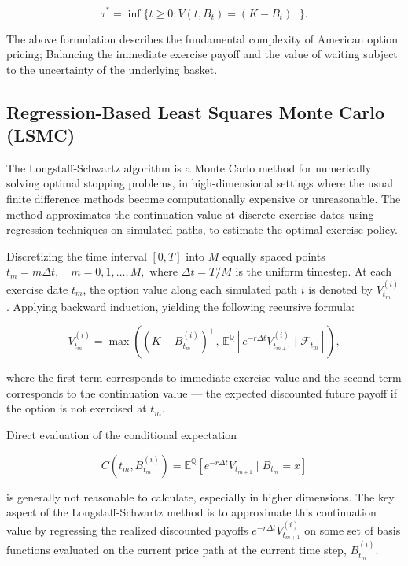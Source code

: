 \documentclass[titlepage]{article}
\begin{document}
\[
\tau^* = \inf \{ t \geq 0 : V(t, B_t) = (K - B_t)^+ \}.
\]

The above formulation describes the fundamental complexity of American option pricing; Balancing the immediate exercise payoff and the value of waiting subject to the uncertainty of the underlying basket.

\subsection{Regression-Based Least Squares Monte Carlo (LSMC)}

The Longstaff-Schwartz algorithm is a Monte Carlo method for numerically solving optimal stopping problems, in high-dimensional settings where the usual finite difference methods become computationally expensive or unreasonable. The method approximates the continuation value at discrete exercise dates using regression techniques on simulated paths, to estimate the optimal exercise policy.

Discretizing the time interval \([0,T]\) into \(M\) equally spaced points \(t_m = m \Delta t, \quad m = 0, 1, \ldots, M,\) where \(\Delta t = T/M\) is the uniform timestep. At each exercise date \(t_m\), the option value along each simulated path \(i\) is denoted by \(V_{t_m}^{(i)}\). Applying backward induction, yielding the following recursive formula:

\begin{equation}
V_{t_m}^{(i)} = \max\left( (K - B_{t_m}^{(i)})^+, \, \mathbb{E}^{\mathbb{Q}}\left[ e^{-r \Delta t} V_{t_{m+1}}^{(i)} \mid \mathcal{F}_{t_m} \right] \right),
\label{eq:lsmc_recursive}
\end{equation}

where the first term corresponds to immediate exercise value and the second term corresponds to the continuation value — the expected discounted future payoff if the option is not exercised at \(t_m\).

Direct evaluation of the conditional expectation

\[
C(t_m, B_{t_m}^{(i)}) = \mathbb{E}^{\mathbb{Q}}\left[ e^{-r \Delta t} V_{t_{m+1}} \mid B_{t_m} = x \right]
\]

is generally not reasonable to calculate, especially in higher dimensions. The key aspect of the Longstaff-Schwartz method is to approximate this continuation value by regressing the realized discounted payoffs \(e^{-r \Delta t} V_{t_{m+1}}^{(i)}\) on some set of basis functions evaluated on the current price path at the current time step, \(B_{t_m}^{(i)}\).
\end{document}
